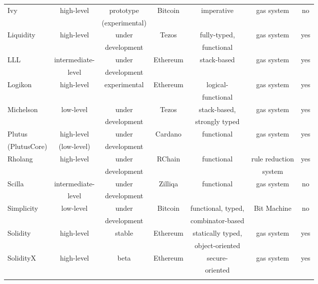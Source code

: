 \begin{ThreePartTable}
\begin{longtable}{  l @{\extracolsep{\fill}} *{6}{c} }
Ivy & high-level& prototype & Bitcoin & imperative & gas system & no\\
& & (experimental) & & & & \\
\addlinespace

Liquidity & high-level & under & Tezos & fully-typed, & gas system & yes\\
& & development & & functional & & \\
\addlinespace

LLL & intermediate-& under & Ethereum & stack-based & gas system & yes\\
& level & development & & & & \\
\addlinespace

Logikon & high-level & experimental & Ethereum & logical- & gas system & yes\\
& & & & functional & & \\
\addlinespace

Michelson & low-level & under & Tezos & stack-based, & gas system & yes\\
& & development & & strongly typed & & \\
\addlinespace

Plutus & high-level & under & Cardano & functional & gas system & yes\\
(PlutusCore) & (low-level) & development & & & & \\
\addlinespace

Rholang & high-level& under & RChain & functional & rule reduction & yes\\
& & development & & & system & \\
\addlinespace

Scilla & intermediate-& under & Zilliqa & functional & gas system & no\\
& level & development & & & & \\
\addlinespace

Simplicity & low-level & under & Bitcoin & functional, typed, & Bit Machine & no \\
& & development & & combinator-based & & \\
\addlinespace

Solidity & high-level & stable & Ethereum & statically typed, & gas system & yes\\
& & & & object-oriented & & \\
\addlinespace

SolidityX & high-level & beta & Ethereum & secure- & gas system & yes\\
& & & & oriented & & \\
\addlinespace


\end{longtable}
\end{ThreePartTable}
